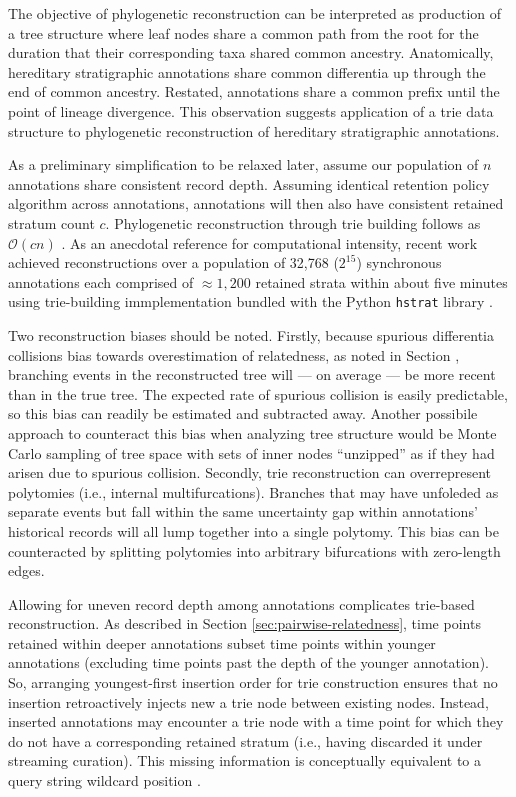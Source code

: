 The objective of phylogenetic reconstruction can be interpreted as production of a tree structure where leaf nodes share a common path from the root for the duration that their corresponding taxa shared common ancestry.
Anatomically, hereditary stratigraphic annotations share common differentia up through the end of common ancestry.
Restated, annotations share a common prefix until the point of lineage divergence.
This observation suggests application of a trie data structure \citep{fredkin1960trie} to phylogenetic reconstruction of hereditary stratigraphic annotations.

As a preliminary simplification to be relaxed later, assume our population of $n$ annotations share consistent record depth.
Assuming identical retention policy algorithm across annotations, annotations will then also have consistent retained stratum count $c$.
Phylogenetic reconstruction through trie building follows as $\mathcal{O}(c n)$ \citep{mehta2018handbook}.
As an anecdotal reference for computational intensity, recent work achieved reconstructions over a population of 32,768 ($2^15$) synchronous annotations each comprised of $\approx 1,200$ retained strata within about five minutes using trie-building immplementation bundled with the Python \texttt{hstrat} library \citep{moreno2023toward}.

Two reconstruction biases should be noted.
Firstly, because spurious differentia collisions bias towards overestimation of relatedness, as noted in Section , branching events in the reconstructed tree will --- on average --- be more recent than in the true tree.
The expected rate of spurious collision is easily predictable, so this bias can readily be estimated and subtracted away.
Another possibile approach to counteract this bias when analyzing tree structure would be Monte Carlo sampling of tree space with sets of inner nodes ``unzipped'' as if they had arisen due to spurious collision.
Secondly, trie reconstruction can overrepresent polytomies (i.e., internal multifurcations).
Branches that may have unfoleded as separate events but fall within the same uncertainty gap within annotations' historical records will all lump together into a single polytomy.
This bias can be counteracted by splitting polytomies into arbitrary bifurcations with zero-length edges.

Allowing for uneven record depth among annotations complicates trie-based reconstruction.
As described in Section \ref{sec:pairwise-relatedness}, time points retained within deeper annotations subset time points within younger annotations (excluding time points past the depth of the younger annotation).
So, arranging youngest-first insertion order for trie construction ensures that no insertion retroactively injects new a trie node between existing nodes.
Instead, inserted annotations may encounter a trie node with a time point for which they do not have a corresponding retained stratum (i.e., having discarded it under streaming curation).
This missing information is conceptually equivalent to a query string wildcard position \citep{fukuyama2016partial}.


